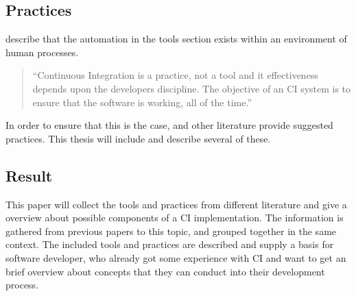 \subsection*{Practices}
\textcite{Humble2010} describe that the automation in the tools section exists within an environment of human processes. 

\begin{quote}
``Continuous Integration is a practice, not a tool and it effectiveness depends upon the developers discipline. The objective of an CI system is to ensure that the software is working, all of the time.'' \autocite{Humble2010}
\end{quote}

\noindent In order to ensure that this is the case, \textcite{Humble2010} and other literature provide suggested practices. This thesis will include and describe several of these.

\subsection*{Result}
This paper will collect the tools and practices from different literature and give a overview about possible components of a CI implementation. The information is gathered from previous papers to this topic, and grouped together in the same context. The included tools and practices are described and supply a basis for software developer, who already got some experience with CI and want to get an brief overview about concepts that they can conduct into their development process.